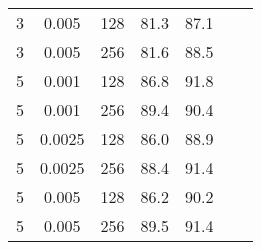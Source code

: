 \begin{table}
\begin{tabular}[htb]{ccccccc}
		3                                       & 0.005                                & 128         & 81.3             & 87.1              \\
		3                                       & 0.005                                & 256         & 81.6             & 88.5              \\
		5                                       & 0.001                                & 128         & 86.8             & 91.8              \\
		5                                       & 0.001                                & 256         & 89.4             & 90.4              \\
		5                                       & 0.0025                               & 128         & 86.0             & 88.9              \\
		5                                       & 0.0025                               & 256         & 88.4             & 91.4              \\
		5                                       & 0.005                                & 128         & 86.2             & 90.2              \\
		5                                       & 0.005                                & 256         & 89.5             & 91.4              \\
		\bottomrule
	\end{tabular}
\end{table}
